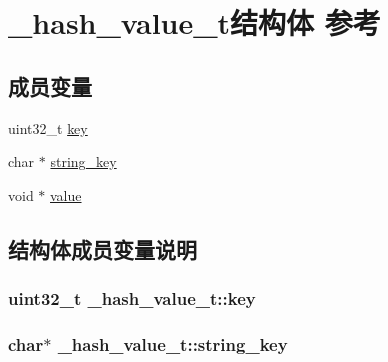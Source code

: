 \hypertarget{a00014}{}\section{\+\_\+hash\+\_\+value\+\_\+t结构体 参考}
\label{a00014}
\subsection*{成员变量}
\begin{DoxyCompactItemize}
\item 
uint32\+\_\+t \hyperlink{a00014_a7159c9891911dc975ebf4134db49e82b_a7159c9891911dc975ebf4134db49e82b}{key}
\item 
char $\ast$ \hyperlink{a00014_a4bf4b998778e8dbda180743cc4da375a_a4bf4b998778e8dbda180743cc4da375a}{string\+\_\+key}
\item 
void $\ast$ \hyperlink{a00014_a2137cdf6c18ab110ebe2a6b0edce5017_a2137cdf6c18ab110ebe2a6b0edce5017}{value}
\end{DoxyCompactItemize}


\subsection{结构体成员变量说明}
\hypertarget{a00014_a7159c9891911dc975ebf4134db49e82b_a7159c9891911dc975ebf4134db49e82b}{}
\subsubsection[{key}]{\setlength{\rightskip}{0pt plus 5cm}uint32\+\_\+t \+\_\+hash\+\_\+value\+\_\+t\+::key}\label{a00014_a7159c9891911dc975ebf4134db49e82b_a7159c9891911dc975ebf4134db49e82b}
\hypertarget{a00014_a4bf4b998778e8dbda180743cc4da375a_a4bf4b998778e8dbda180743cc4da375a}{}
\subsubsection[{string\+\_\+key}]{\setlength{\rightskip}{0pt plus 5cm}char$\ast$ \+\_\+hash\+\_\+value\+\_\+t\+::string\+\_\+key}\label{a00014_a4bf4b998778e8dbda180743cc4da375a_a4bf4b998778e8dbda180743cc4da375a}
\hypertarget{a00014_a2137cdf6c18ab110ebe2a6b0edce5017_a2137cdf6c18ab110ebe2a6b0edce5017}{}
